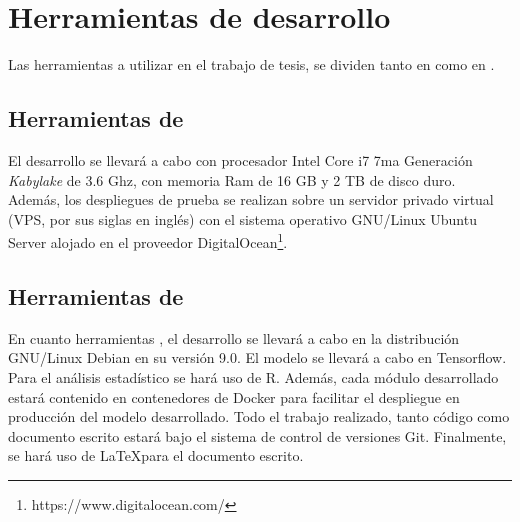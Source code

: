\section{Herramientas de desarrollo}
\label{sec:herramientas}
Las herramientas a utilizar en el trabajo de tesis, se dividen tanto en  como en .

\subsection{Herramientas de }
El desarrollo se llevará a cabo con procesador Intel Core i7 7ma Generación \textit{Kabylake} de 3.6 Ghz, con memoria Ram de 16 GB y 2 TB de disco duro. Además, los despliegues de prueba se realizan sobre un servidor privado virtual (VPS, por sus siglas en inglés) con el sistema operativo GNU/Linux Ubuntu Server alojado en el proveedor DigitalOcean\footnote{https://www.digitalocean.com/}.

\subsection{Herramientas de }
En cuanto herramientas , el desarrollo se llevará a cabo en la distribución GNU/Linux Debian en su versión 9.0. El modelo se llevará a cabo en Tensorflow. Para el análisis estadístico se hará uso de R. Además, cada módulo desarrollado estará contenido en contenedores de Docker para facilitar el despliegue en producción del modelo desarrollado. Todo el trabajo realizado, tanto código como documento escrito estará bajo el sistema de control de versiones Git. Finalmente, se hará uso de \LaTeX para el documento escrito.